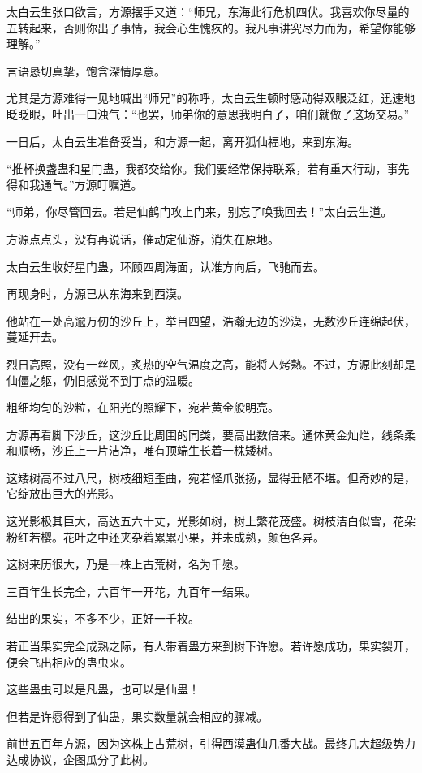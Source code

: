 \begin{this_body}
太白云生张口欲言，方源摆手又道：“师兄，东海此行危机四伏。我喜欢你尽量的五转起来，否则你出了事情，我会心生愧疚的。我凡事讲究尽力而为，希望你能够理解。”

言语恳切真挚，饱含深情厚意。

尤其是方源难得一见地喊出“师兄”的称呼，太白云生顿时感动得双眼泛红，迅速地眨眨眼，吐出一口浊气：“也罢，师弟你的意思我明白了，咱们就做了这场交易。”

一日后，太白云生准备妥当，和方源一起，离开狐仙福地，来到东海。

“推杯换盏蛊和星门蛊，我都交给你。我们要经常保持联系，若有重大行动，事先得和我通气。”方源叮嘱道。

“师弟，你尽管回去。若是仙鹤门攻上门来，别忘了唤我回去！”太白云生道。

方源点点头，没有再说话，催动定仙游，消失在原地。

太白云生收好星门蛊，环顾四周海面，认准方向后，飞驰而去。

再现身时，方源已从东海来到西漠。

他站在一处高逾万仞的沙丘上，举目四望，浩瀚无边的沙漠，无数沙丘连绵起伏，蔓延开去。

烈日高照，没有一丝风，炙热的空气温度之高，能将人烤熟。不过，方源此刻却是仙僵之躯，仍旧感觉不到丁点的温暖。

粗细均匀的沙粒，在阳光的照耀下，宛若黄金般明亮。

方源再看脚下沙丘，这沙丘比周围的同类，要高出数倍来。通体黄金灿烂，线条柔和顺畅，沙丘上一片洁净，唯有顶端生长着一株矮树。

这矮树高不过八尺，树枝细短歪曲，宛若怪爪张扬，显得丑陋不堪。但奇妙的是，它绽放出巨大的光影。

这光影极其巨大，高达五六十丈，光影如树，树上繁花茂盛。树枝洁白似雪，花朵粉红若樱。花叶之中还夹杂着累累小果，并未成熟，颜色各异。

这树来历很大，乃是一株上古荒树，名为千愿。

三百年生长完全，六百年一开花，九百年一结果。

结出的果实，不多不少，正好一千枚。

若正当果实完全成熟之际，有人带着蛊方来到树下许愿。若许愿成功，果实裂开，便会飞出相应的蛊虫来。

这些蛊虫可以是凡蛊，也可以是仙蛊！

但若是许愿得到了仙蛊，果实数量就会相应的骤减。

前世五百年方源，因为这株上古荒树，引得西漠蛊仙几番大战。最终几大超级势力达成协议，企图瓜分了此树。


\end{this_body}
